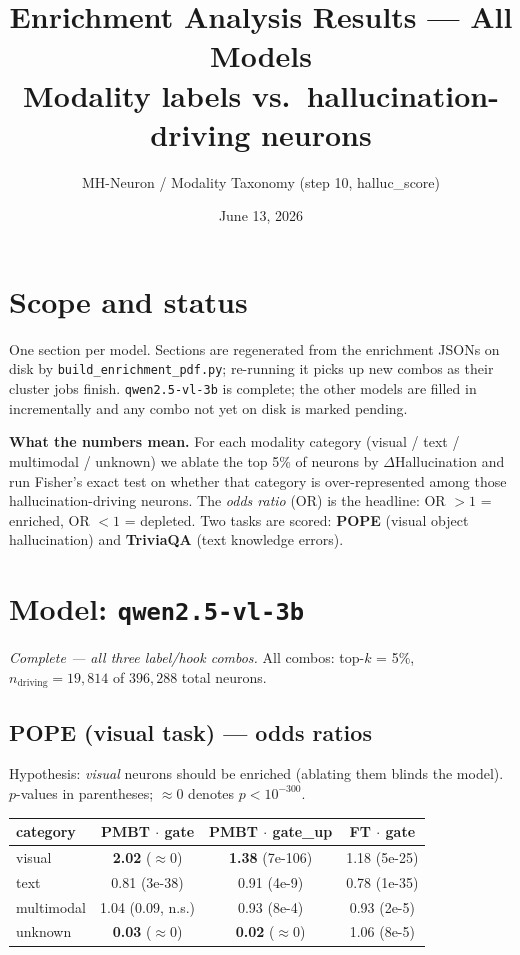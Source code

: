 \documentclass[11pt,a4paper]{article}
\title{Enrichment Analysis Results --- All Models\\[0.3em]
\large Modality labels vs.\ hallucination-driving neurons}
\author{MH-Neuron / Modality Taxonomy (step 10, halluc\_score)}
\date{June 13, 2026}
\begin{document}
\maketitle

\section*{Scope and status}
One section per model. Sections are regenerated from the enrichment JSONs on
disk by \texttt{build\_\allowbreak enrichment\_\allowbreak pdf.py}; re-running it picks up new combos as
their cluster jobs finish. \texttt{qwen2.5-vl-3b} is complete; the other models
are filled in incrementally and any combo not yet on disk is marked pending.

\textbf{What the numbers mean.} For each modality category (visual / text /
multimodal / unknown) we ablate the top 5\% of neurons by $\Delta$Hallucination
and run Fisher's exact test on whether that category is over-represented among
those hallucination-driving neurons. The \emph{odds ratio} (OR) is the headline:
OR $>1$ = enriched, OR $<1$ = depleted. Two tasks are scored: \textbf{POPE}
(visual object hallucination) and \textbf{TriviaQA} (text knowledge errors).


\section{Model: \texttt{qwen2.5-vl-3b}}
\emph{Complete --- all three label/hook combos.} All combos: top-$k$ = 5\%,
$n_{\text{driving}}=19{,}814$ of $396{,}288$ total neurons.

\subsection{POPE (visual task) --- odds ratios}
Hypothesis: \emph{visual} neurons should be enriched (ablating them blinds the
model). $p$-values in parentheses; $\approx$0 denotes $p<10^{-300}$.

\begin{center}
\begin{tabular}{lccc}
\toprule
category & PMBT $\cdot$ gate & PMBT $\cdot$ gate\_up & FT $\cdot$ gate \\
\midrule
visual     & \textbf{2.02} ($\approx$0)      & \textbf{1.38} (7e-106) & 1.18 (5e-25) \\
text       & 0.81 (3e-38)        & 0.91 (4e-9)            & 0.78 (1e-35) \\
multimodal & 1.04 (0.09, n.s.)   & 0.93 (8e-4)            & 0.93 (2e-5)  \\
unknown    & \textbf{0.03} ($\approx$0)      & \textbf{0.02} ($\approx$0)         & 1.06 (8e-5)  \\
\bottomrule
\end{tabular}
\end{center}
\end{document}
